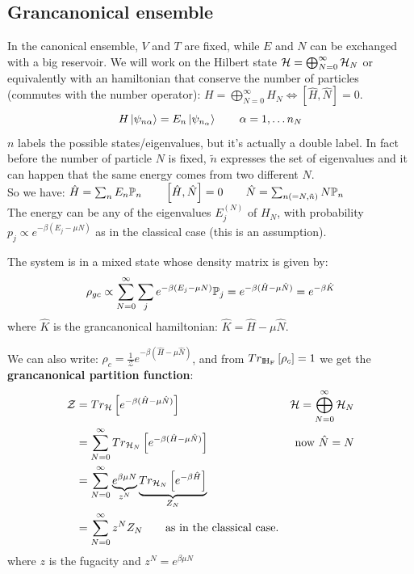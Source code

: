 \subsection{Grancanonical ensemble}
In the canonical ensemble, $V$ and $T$ are fixed, while $E$ and $N$ can be exchanged with a big reservoir. We will work on the Hilbert state $\mathcal{H} = \bigoplus_{N=0}^\infty \mathcal{H}_N$ or equivalently with an hamiltonian that conserve the number of particles (commutes with the number operator): \qquad $H = \bigoplus_{N=0}^\infty H_N \iff \left[\hat H, \hat N\right] = 0$.\\
$$H \left|\psi_{n\alpha}\right\rangle = E_n \left|\psi_{n_\alpha}\right\rangle \qquad \alpha = 1, \dots n_N$$
$n$ labels the possible states/eigenvalues, but it's actually a double label. In fact before the number of particle $N$ is fixed, $\tilde n$ expresses the set of eigenvalues and it can happen that the same energy comes from two different $N$.\\
So we have: $\hat H = \sum_n E_n \mathbb{P}_n \qquad \left[\hat H , \hat N\right] = 0 \qquad \hat N= \sum_{n (=N,\tilde n)} N \mathbb{P}_n$\\
The energy can be any of the eigenvalues $E_j^{(N)}$ of $H_N$, with probability\\ $p_j \propto e^{-\beta(E_j - \mu N)}$ as in the classical case (this is an assumption).

The system is in a mixed state whose density matrix is given by:
$$ \rho_{gc} \propto \sum_{N=0}^\infty\sum_j e^{-\beta(E_j - \mu N)} \mathbb{P}_j = e^{-\beta(\hat H - \mu \hat N)} = e^{-\beta \hat K}$$
where $\hat K$ is the grancanonical hamiltonian: $\hat K = \hat H - \mu \hat N$.

We can also write: $ \rho_c = \frac 1{\mathcal Z} e ^{-\beta (\hat H - \mu \hat N)}$, and from $Tr_{\rm I\!H_F}\left[\rho_c\right]= 1$ we get the \textbf{grancanonical partition function}:
\begin{align*}
    \mathcal Z &= Tr_{\mathcal{H}}\left[e^{-\beta (\hat H - \mu \hat N)}\right] &\mathcal{H} = \bigoplus_{N=0}^\infty \mathcal{H}_N\\
    &= \sum_{N=0}^\infty Tr_{\mathcal{H}_N} \left[e^{-\beta(\hat H - \mu\hat N)}\right] &\text{now $\hat N = N$}\\
    &= \sum_{N=0}^\infty \underbrace{e^{\beta\mu N}}_{z^N} \underbrace{Tr_{\mathcal{H}_N}\left[e^{-\beta \hat H}\right]}_{Z_N} \\
    &= \sum_{N=0}^\infty z^N Z_N \qquad \text{as in the classical case.}
\end{align*}
where $z$ is the fugacity and $z^N = e^{\beta\mu N}$\\

